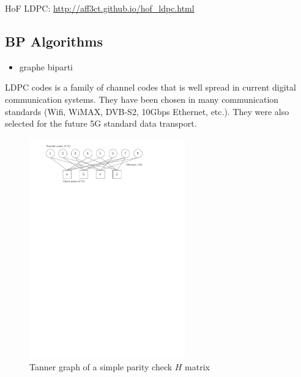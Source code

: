 HoF LDPC: \url{http://aff3ct.github.io/hof_ldpc.html}

\subsection{BP Algorithms}

\begin{itemize}
  \item graphe biparti
\end{itemize}

LDPC codes is a family of channel codes that is well spread in current digital
communication systems. They have been chosen in many communication standards
(Wifi, WiMAX, DVB-S2, 10Gbps Ethernet, etc.). They were also selected for the
future 5G standard data transport.

\begin{figure}
  \centering
  \includegraphics[width=0.60\textwidth]{ldpc/ldpc_tanner_graph}
  \caption{Tanner graph of a simple parity check $H$ matrix}
  \label{fig:LDPC}
\end{figure}

